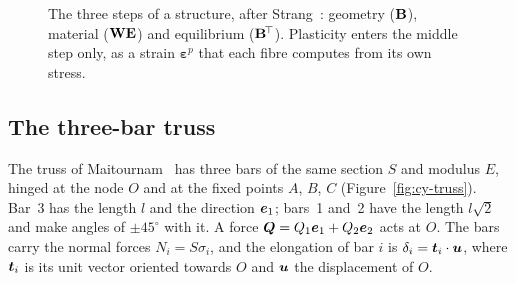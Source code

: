 \begin{figure}[h]
\centering
{}
\caption{The three steps of a structure, after Strang~\cite{Strang1986c}:
geometry ($\mathbf{B}$), material ($\mathbf{W}\mathbf{E}$) and equilibrium
($\mathbf{B}^{\!\top}$). Plasticity enters the middle step only, as a strain
$\boldsymbol\varepsilon^p$ that each fibre computes from its own stress.}
\label{fig:cy-ATCA}
\end{figure}

\subsection{The three-bar truss}\label{ssec:cy-truss}
%
The truss of Maitournam~\cite[Sec.~3.6]{Maitournam2012c} has three bars of
the same section $S$ and modulus $E$, hinged at the node $O$ and at the fixed
points $A$, $B$, $C$ (Figure~\ref{fig:cy-truss}). Bar~3 has the length $l$
and the direction $\bm{e}_1$; bars~1 and~2 have the length $l\sqrt2$ and
make angles of $\pm45^\circ$ with it. A force $\bm{Q}=Q_1\bm{e}_1+Q_2\bm{e}_2$ acts at $O$. The bars carry the normal forces $N_i=S\sigma_i$, and the
elongation of bar $i$ is $\delta_i=\bm{t}_i\cdot\bm{u}$, where $\bm{t}_i$ is
its unit vector oriented towards $O$ and $\bm{u}$ the displacement of $O$.

